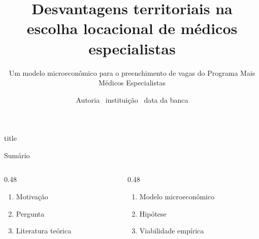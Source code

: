\documentclass[aspectratio=169,11pt]{beamer}
\title{Desvantagens territoriais na escolha locacional de médicos especialistas}
\subtitle{Um modelo microeconômico para o preenchimento de vagas do Programa
Mais Médicos Especialistas}
\author{Autoria \textperiodcentered\ instituição \textperiodcentered\ data da banca}
\date{}
\def\rastreiotexto{}
\newcommand{\rastreio}[1]{\gdef\rastreiotexto{#1}}
\begin{document}
\rastreio{}
\begin{frame}[plain]
  \begin{center}
    \begin{minipage}{0.82\textwidth}
      \begin{beamercolorbox}[wd=\textwidth,sep=0.9em,center,rounded=true]{title}
        \inserttitle\par
        \vspace{0.45em}
        {\insertsubtitle\par}
      \end{beamercolorbox}
    \end{minipage}

    \vspace{1.1em}
    {\color{cinzaFonte}\small\insertauthor\par}
  \end{center}
\end{frame}

\rastreio{}
\begin{frame}{Sumário}
  \vfill
  \begin{columns}[T]
    \begin{column}{0.48\textwidth}
      \large
      \begin{enumerate}
        \setlength{\itemsep}{1.1em}
        \item Motivação
        \item Pergunta
        \item Literatura teórica
      \end{enumerate}
    \end{column}
    \begin{column}{0.48\textwidth}
      \large
      \begin{enumerate}
        \setlength{\itemsep}{1.1em}
        \setcounter{enumi}{3}
        \item Modelo microeconômico
        \item Hipótese
        \item Viabilidade empírica
      \end{enumerate}
    \end{column}
  \end{columns}
  \vfill
\end{frame}
\end{document}
